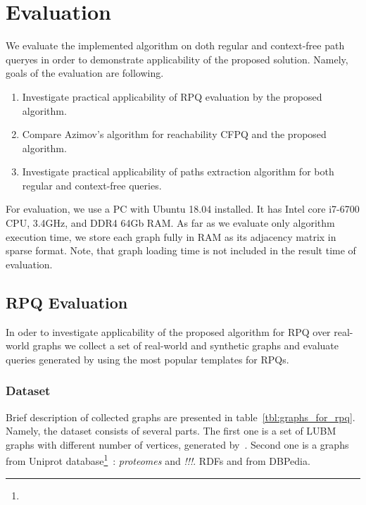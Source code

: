 \section{Evaluation}

We evaluate the implemented algorithm on doth regular and context-free path queryes in order to demonstrate applicability of the proposed solution.
Namely, goals of the evaluation are following.
\begin{enumerate}
	\item Investigate practical applicability of RPQ evaluation by the proposed algorithm.
	\item Compare Azimov's algorithm for reachability CFPQ and the proposed algorithm.
	\item Investigate practical applicability of paths extraction algorithm for both regular and context-free queries.
\end{enumerate}

For evaluation, we use a PC with Ubuntu 18.04 installed.
It has Intel core i7-6700 CPU, 3.4GHz, and DDR4 64Gb RAM.
As far as we evaluate only algorithm execution time, we store each graph fully in RAM as its adjacency matrix in sparse format.
Note, that graph loading time is not included in the result time of evaluation.	

\subsection{RPQ Evaluation}

In oder to investigate applicability of the proposed algorithm for RPQ over real-world graphs we collect a set of real-world and synthetic graphs and evaluate queries generated by using the most popular templates for RPQs.

\subsubsection{Dataset}

Brief description of collected graphs are presented in table~\ref{tbl:graphs_for_rpq}.
Namely, the dataset consists of several parts.
The first one is a set of LUBM graphs with different number of vertices, generated by~\cite{!!!}.
Second one is a graphs from Uniprot database\footnote{}~\cite{!!!}: \textit{proteomes} and \textit{!!!}.
RDFs and from DBPedia.


